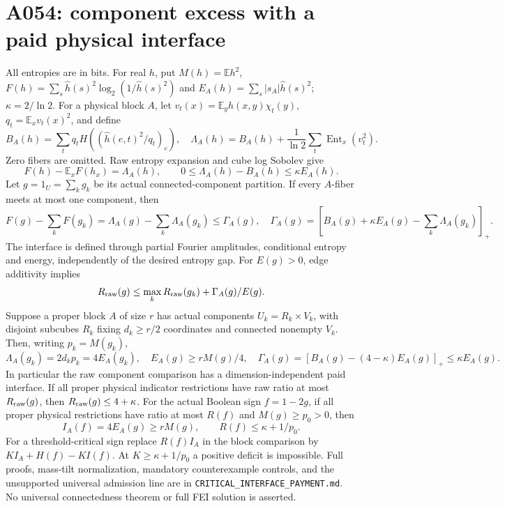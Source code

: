 \documentclass{article}
\begin{document}
\section*{A054: component excess with a paid physical interface}
All entropies are in bits. For real $h$, put $M(h)=\mathbb Eh^2$,
$F(h)=\sum_s\widehat h(s)^2\log_2(1/\widehat h(s)^2)$ and
$E_A(h)=\sum_s|s_A|\widehat h(s)^2$; $\kappa=2/\ln2$.
For a physical block $A$, let $v_t(x)=\mathbb E_yh(x,y)\chi_t(y)$,
$q_t=\mathbb E_xv_t(x)^2$, and define
\[
B_A(h)=\sum_tq_t H((\widehat h(e,t)^2/q_t)_e),\quad
\Lambda_A(h)=B_A(h)+\frac1{\ln2}\sum_t\operatorname{Ent}_x(v_t^2).
\]
Zero fibers are omitted. Raw entropy expansion and cube log Sobolev give
\[
F(h)-\mathbb E_xF(h_x)=\Lambda_A(h),\qquad
0\le\Lambda_A(h)-B_A(h)\le\kappa E_A(h).
\]
Let $g=1_U=\sum_k g_k$ be its actual connected-component partition.
If every $A$-fiber meets at most one component, then
\[
F(g)-\sum_kF(g_k)=\Lambda_A(g)-\sum_k\Lambda_A(g_k)
\le\Gamma_A(g),\quad
\Gamma_A(g)=\left[B_A(g)+\kappa E_A(g)-\sum_k\Lambda_A(g_k)\right]_+.
\]
The interface is defined through partial Fourier amplitudes, conditional
entropy and energy, independently of the desired entropy gap.
For $E(g)>0$, edge additivity implies
\[
R_{\rm raw}(g)\le\max_kR_{\rm raw}(g_k)+\Gamma_A(g)/E(g).
\]
Suppose a proper block $A$ of size $r$ has actual components
$U_k=R_k\times V_k$, with disjoint subcubes $R_k$ fixing $d_k\ge r/2$
coordinates and connected nonempty $V_k$. Then, writing $p_k=M(g_k)$,
\[
\Lambda_A(g_k)=2d_kp_k=4E_A(g_k),\quad
E_A(g)\ge rM(g)/4,\quad
\Gamma_A(g)=[B_A(g)-(4-\kappa)E_A(g)]_+\le\kappa E_A(g).
\]
In particular the raw component comparison has a dimension-independent
paid interface. If all proper physical indicator restrictions have raw
ratio at most $R_{\rm raw}(g)$, then
$R_{\rm raw}(g)\le4+\kappa$.
For the actual Boolean sign $f=1-2g$, if all proper physical restrictions
have ratio at most $R(f)$ and $M(g)\ge p_0>0$, then
\[
I_A(f)=4E_A(g)\ge rM(g),\qquad R(f)\le\kappa+1/p_0.
\]
For a threshold-critical sign replace $R(f)I_A$ in the block comparison
by $KI_A+H(f)-KI(f)$. At $K\ge\kappa+1/p_0$ a positive deficit is impossible.
Full proofs, mass-tilt normalization, mandatory counterexample controls,
and the unsupported universal admission line are in
\texttt{CRITICAL\_INTERFACE\_PAYMENT.md}. No universal connectedness theorem
or full FEI solution is asserted.
\end{document}
